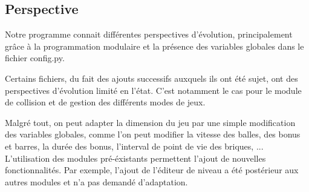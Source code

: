   \subsection{Perspective }
    Notre programme connait différentes perspectives d'évolution, principalement grâce à la programmation modulaire et la présence des variables globales dans le fichier config.py.

    Certains fichiers, du fait des ajouts successifs auxquels ils ont été sujet, ont des perspectives d'évolution limité en l'état. C'est notamment le cas pour le module de collision et de gestion des différents modes de jeux.

		Malgré tout, on peut adapter la dimension du jeu par une simple modification des variables globales, comme l'on peut modifier la vitesse des balles, des bonus et barres, la durée des bonus, l'interval de point de vie des briques, ...
    L'utilisation des modules pré-éxistants permettent l'ajout de nouvelles fonctionnalités. Par exemple, l'ajout de l'éditeur de niveau a été postérieur aux autres modules et n'a pas demandé d'adaptation.
